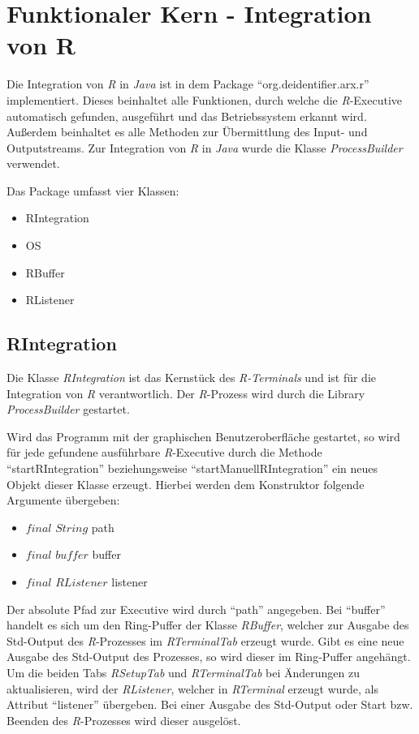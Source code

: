 \documentclass[a4paper, 12pt]{report} %
\begin{document}
\section{Funktionaler Kern - Integration von R} \label{funktionaler Kern}

Die Integration von \textit{R} in \textit{Java} ist in dem Package "`org.deidentifier.arx.r"' implementiert. Dieses beinhaltet alle Funktionen, durch welche die \textit{R}-Executive automatisch gefunden, ausgeführt und das Betriebssystem erkannt wird. Außerdem beinhaltet es alle Methoden zur Übermittlung des Input- und Outputstreams.
Zur Integration von \textit{R} in \textit{Java} wurde die Klasse \textit{ProcessBuilder} \cite{processBuilder} verwendet.

\begin{samepage}
Das Package umfasst vier Klassen:
\begin{itemize}
	\item RIntegration
	\item OS
	\item RBuffer
	\item RListener
\end{itemize}
\end{samepage}


\subsection{RIntegration} \label{RIntegration}

Die Klasse \textit{RIntegration} ist das Kernstück des \textit{R-Terminals} und ist für die Integration von \textit{R} verantwortlich. Der \textit{R}-Prozess wird durch die Library \textit{ProcessBuilder} \cite{processBuilder} gestartet.

Wird das Programm mit der graphischen Benutzeroberfläche gestartet, so wird für jede gefundene ausführbare \textit{R}-Executive durch die Methode "`startRIntegration"' beziehungsweise "`startManuellRIntegration"' ein neues Objekt dieser Klasse erzeugt.
Hierbei werden dem Konstruktor folgende Argumente übergeben:
\begin{itemize}
	\item $final$ $String$ path
	\item $final$ $buffer$ buffer 
	\item $final$ $RListener$ listener
\end{itemize}
%
Der absolute Pfad zur Executive wird durch "`path"' angegeben. Bei "`buffer"' handelt es sich um den Ring-Puffer der Klasse \textit{RBuffer}, welcher zur Ausgabe des Std-Output des \textit{R}-Prozesses im \textit{RTerminalTab} erzeugt wurde. Gibt es eine neue Ausgabe des Std-Output des Prozesses, so wird dieser im Ring-Puffer angehängt. 
Um die beiden Tabs \textit{RSetupTab} und \textit{RTerminalTab} bei Änderungen zu aktualisieren, wird der \textit{RListener}, welcher in \textit{RTerminal} erzeugt wurde, als Attribut "`listener"' übergeben.
Bei einer Ausgabe des Std-Output oder Start bzw. Beenden des \textit{R}-Prozesses wird dieser ausgelöst.\\
\end{document}
